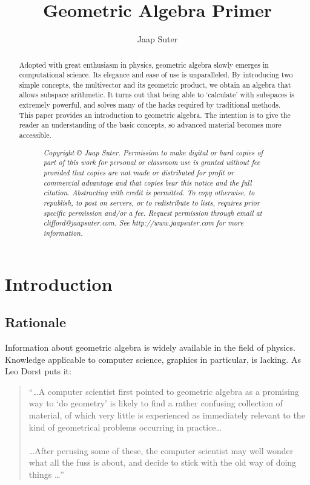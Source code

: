 \documentclass[10pt]{report}
\author{Jaap Suter}
\title{Geometric Algebra Primer}
\begin{document}
\maketitle

\begin{abstract}
Adopted with great enthusiasm in physics, geometric algebra slowly
emerges in computational science. Its elegance and ease of use is
unparalleled. By introducing two simple concepts, the multivector
and its geometric product, we obtain an algebra that allows
subspace arithmetic. It turns out that being able to `calculate'
with subspaces is extremely powerful, and solves many of the hacks
required by traditional methods. This paper provides an
introduction to geometric algebra. The intention is to give the
reader an understanding of the basic concepts, so advanced
material becomes more accessible.

\begin{figure}[!b]
\emph{Copyright \copyright {} Jaap Suter. Permission to make
digital or hard copies of part of this work for personal or
classroom use is granted without fee provided that copies are not
made or distributed for profit or commercial advantage and that
copies bear this notice and the full citation. Abstracting with
credit is permitted. To copy otherwise, to republish, to post on
servers, or to redistribute to lists, requires prior specific
permission and/or a fee. Request permission through email at
clifford@jaapsuter.com. See http://www.jaapsuter.com for more
information.}
\end{figure}

\end{abstract}

\tableofcontents
\listoffigures

\chapter{Introduction}

\section{Rationale}

Information about geometric algebra is widely available in the
field of physics. Knowledge applicable to computer science,
graphics in particular, is lacking. As Leo Dorst \cite{bib:dorst
honing geometric algebra} puts it:

\begin{quotation}
``\ldots A computer scientist first pointed to geometric algebra
as a promising way to `do geometry' is likely to find a rather
confusing collection of material, of which very little is
experienced as immediately relevant to the kind of geometrical
problems occurring in practice\ldots
\\
\\
\ldots After perusing some of these, the computer scientist may
well wonder what all the fuss is about, and decide to stick with
the old way of doing things \ldots''
\end{quotation}
\end{document}
